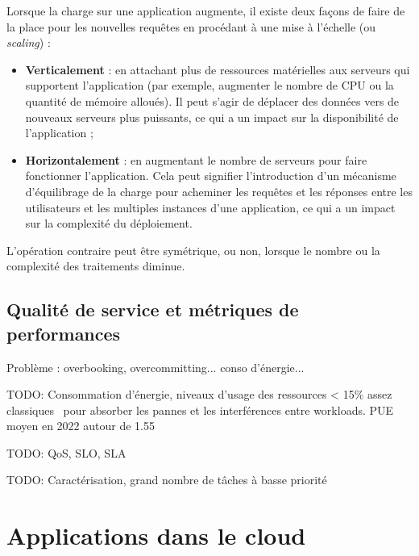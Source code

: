 Lorsque la charge sur une application augmente, il existe deux façons de faire de la place pour les nouvelles requêtes en procédant à une mise à l'échelle (ou \textit{scaling}) :

\begin{itemize}
    \item \textbf{Verticalement} : en attachant plus de ressources matérielles aux serveurs qui supportent l'application (par exemple, augmenter le nombre de CPU ou la quantité de mémoire alloués). Il peut s'agir de déplacer des données vers de nouveaux serveurs plus puissants, ce qui a un impact sur la disponibilité de l'application ;
    \item \textbf{Horizontalement} : en augmentant le nombre de serveurs pour faire fonctionner l'application. Cela peut signifier l'introduction d'un mécanisme d'équilibrage de la charge pour acheminer les requêtes et les réponses entre les utilisateurs et les multiples instances d'une application, ce qui a un impact sur la complexité du déploiement.
\end{itemize}

L'opération contraire peut être symétrique, ou non, lorsque le nombre ou la complexité des traitements diminue.

\subsection{Qualité de service et métriques de performances}

Problème : overbooking, overcommitting... conso d'énergie...


TODO: Consommation d'énergie, niveaux d'usage des ressources < 15\% assez classiques~\cite{vasanWorthTheirWatts2010, vermaLargescaleClusterManagement2015a} pour absorber les pannes et les interférences entre workloads. PUE moyen en 2022 autour de 1.55~\cite{davisUptimeInstituteGlobal2022}

TODO: QoS, SLO, SLA

TODO: Caractérisation, grand nombre de tâches à basse priorité~\cite{tirmaziBorgNextGeneration2020}

\section{Applications dans le cloud}

